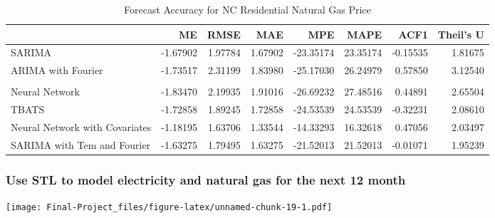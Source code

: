 \documentclass[
]{article}
\begin{document}
\begin{table}[!h]

\caption{\label{tab:unnamed-chunk-18}Forecast Accuracy for NC Residential Natural Gas Price}
\centering
\begin{tabular}[t]{l|r|r|r|r|r|r|r}
\hline
  & ME & RMSE & MAE & MPE & MAPE & ACF1 & Theil's U\\
\hline
SARIMA & -1.67902 & 1.97784 & 1.67902 & -23.35174 & 23.35174 & -0.15535 & 1.81675\\
\hline
ARIMA with Fourier & -1.73517 & 2.31199 & 1.83980 & -25.17030 & 26.24979 & 0.57850 & 3.12540\\
\hline
\cellcolor{red}{STL} & \cellcolor{red}{-1.04788} & \cellcolor{red}{1.35599} & \cellcolor{red}{1.11314} & \cellcolor{red}{-14.03428} & \cellcolor{red}{14.80904} & \cellcolor{red}{-0.33348} & \cellcolor{red}{1.28849}\\
\hline
Neural Network & -1.83470 & 2.19935 & 1.91016 & -26.69232 & 27.48516 & 0.44891 & 2.65504\\
\hline
TBATS & -1.72858 & 1.89245 & 1.72858 & -24.53539 & 24.53539 & -0.32231 & 2.08610\\
\hline
Neural Network with Covariates & -1.18195 & 1.63706 & 1.33544 & -14.33293 & 16.32618 & 0.47056 & 2.03497\\
\hline
SARIMA with Tem and Fourier & -1.63275 & 1.79495 & 1.63275 & -21.52013 & 21.52013 & -0.01071 & 1.95239\\
\hline
\end{tabular}
\end{table}

\hypertarget{use-stl-to-model-electricity-and-natural-gas-for-the-next-12-month}{%
\subsubsection{Use STL to model electricity and natural gas for the next
12
month}\label{use-stl-to-model-electricity-and-natural-gas-for-the-next-12-month}}

\texttt{[image: Final-Project\_files/figure-latex/unnamed-chunk-19-1.pdf]}
\end{document}
